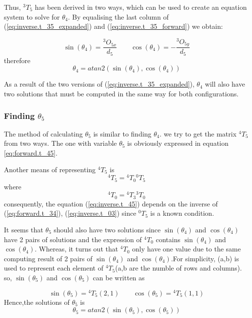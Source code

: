 \documentclass{article}
\renewcommand{\c}[1]{\cos(\theta_{#1})}
\newcommand{\s}[1]{\sin(\theta_{#1})}
\newcommand{\T}[2]{{}^{#1}T_{#2}}
\renewcommand{\O}[2]{{}^{#1}O_{#2}}
\begin{document}
Thus, $\T{3}{5}$ has been derived in two ways, which can be used to create an equation system to solve for $\theta_4$. By equalising the last column of (\ref{eq:inverse.t_35_expanded}) and (\ref{eq:inverse.t_35_forward}) we obtain:

\begin{equation}
\s{4} = \frac{\O{3}{5x}}{d_5}
\qquad
\c{4} = -\frac{\O{3}{5y}}{d_5}
\end{equation}
therefore
\begin{equation}
\theta_{4} = atan2(\s{4},\c{4})
\end{equation}

As a result of the two versions of (\ref{eq:inverse.t_35_expanded}), $\theta_4$ will also have two solutions that must be computed in the same way for both configurations.

\subsubsection{Finding $\theta_5$}
The method of calculating $\theta_5$ is similar to finding $\theta_4$. we try to get the matrix  $\T{4}{5}$ from two ways. The one with variable $\theta_5$ is obviously expressed in equation \ref{eq:forward.t_45}.

Another means of representing $\T{4}{5}$ is 
\begin{equation}
\label{eq:inverse.t_45}
\T{4}{5} = \T{4}{0} \T{0}{5}
\end{equation}
where
\begin{equation*}
\T{4}{0} = \T{4}{3}\T{3}{0}
\end{equation*}
consequently, the equation (\ref{eq:inverse.t_45}) depends on the inverse of (\ref{eq:forward.t_34}), (\ref{eq:inverse.t_03}) since $\T{0}{5}$ is a known condition. 

It seems that $\theta_5$ should also have two solutions since $\s{4}$ and $\c{4}$ have 2 pairs of solutions and the expression of $\T{4}{0}$ contains $\s{4}$ and $\c{4}$. Whereas, it turns out that $\T{4}{0}$ only have one value due to the same computing result of 2 pairs of $\s{4}$ and $\c{4}$.For simplicity, (a,b) is used to represent each element of $\T{4}{5}$(a,b are the numble of rows and columns). so, $\s{5}$ and $\c{5}$ can be written as

\begin{equation}
\s{5} = \T{4}{5}(2,1)
\qquad
\c{5} = \T{4}{5}(1,1)
\end{equation}
Hence,the solutions of $\theta_5$ is
\begin{equation}
\theta_{5} = atan2(\s{5},\c{5})
\end{equation}
\end{document}
